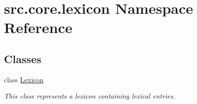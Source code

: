 \hypertarget{namespacesrc_1_1core_1_1lexicon}{\section{src.\+core.\+lexicon Namespace Reference}
\label{namespacesrc_1_1core_1_1lexicon}
}
\subsection*{Classes}
\begin{DoxyCompactItemize}
\item 
class \hyperlink{classsrc_1_1core_1_1lexicon_1_1_lexicon}{Lexicon}
\begin{DoxyCompactList}\small\item\em This class represents a lexicon containing lexical entries. \end{DoxyCompactList}\end{DoxyCompactItemize}

